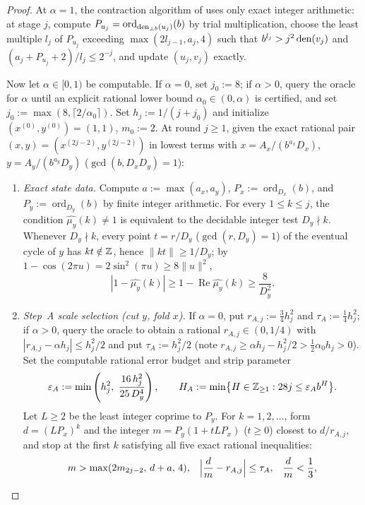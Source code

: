 \documentclass[11pt]{article}
\newcommand{\dist}[1]{\lVert #1\rVert}
\DeclareMathOperator{\ord}{ord}
\begin{document}
\begin{proof}
At $\alpha=1$, the contraction algorithm of  uses only exact integer arithmetic: at stage $j$, compute $P_{u_j}=\ord_{\den_{\perp b}(u_j)}(b)$ by trial multiplication, choose the least multiple $l_j$ of $P_{u_j}$ exceeding $\max(2l_{j-1},a_j,4)$ such that $b^{l_j}>j^2\operatorname{den}(v_j)$ and $(a_j+P_{u_j}+2)/l_j\le 2^{-j}$, and update $(u_j,v_j)$ exactly.

Now let $\alpha\in[0,1)$ be computable. If $\alpha=0$, set $j_0:=8$; if $\alpha>0$, query the oracle for $\alpha$ until an explicit rational lower bound $\alpha_0\in(0,\alpha)$ is certified, and set $j_0:=\max(8,\lceil 2/\alpha_0\rceil)$. Set $h_j:=1/(j+j_0)$ and initialize $(x^{(0)},y^{(0)})=(1,1)$, $m_0:=2$. At round $j\ge1$, given the exact rational pair $(x,y)=(x^{(2j-2)},y^{(2j-2)})$ in lowest terms with $x=A_x/(b^{a_x}D_x)$, $y=A_y/(b^{a_y}D_y)$ ($\gcd(b,D_xD_y)=1$):
\begin{enumerate}[label=\textup{Step \arabic*.},leftmargin=*,nosep]
\item \emph{Exact state data.} Compute $a:=\max(a_x,a_y)$, $P_x:=\ord_{D_x}(b)$, and $P_y:=\ord_{D_y}(b)$ by finite integer arithmetic. For every $1\le k\le j$, the condition $\widehat{\mu_y}(k)\ne1$ is equivalent to the decidable integer test $D_y\nmid k$. Whenever $D_y\nmid k$, every point $t=r/D_y$ ($\gcd(r,D_y)=1$) of the eventual cycle of $y$ has $kt\notin\mathbb Z$, hence $\dist{kt}\ge 1/D_y$; by $1-\cos(2\pi u)=2\sin^2(\pi u)\ge 8\dist{u}^2$,
\[
|1-\widehat{\mu_y}(k)|\ge 1-\operatorname{Re}\widehat{\mu_y}(k)\ge\frac{8}{D_y^2}.
\]
\item \emph{Step~A scale selection (cut $y$, fold $x$).} If $\alpha=0$, put $r_{A,j}:=\frac34 h_j^2$ and $\tau_A:=\frac14 h_j^2$; if $\alpha>0$, query the oracle to obtain a rational $r_{A,j}\in(0,1/4)$ with $|r_{A,j}-\alpha h_j|\le h_j^2/2$ and put $\tau_A:=h_j^2/2$ (note $r_{A,j}\ge\alpha h_j-h_j^2/2>\frac12\alpha_0h_j>0$). Set the computable rational error budget and strip parameter
\[
\varepsilon_A:=\min\left(h_j^2,\ \frac{16\,h_j^2}{25\,D_y^4}\right),\qquad
H_A:=\min\bigl\{H\in\Z_{\ge1}:28j\le\varepsilon_A b^H\bigr\}.
\]
Let $L\ge2$ be the least integer coprime to $P_y$. For $k=1,2,\dots$, form $d=(LP_x)^k$ and the integer $m=P_y(1+tLP_x)$ ($t\ge0$) closest to $d/r_{A,j}$, and stop at the first $k$ satisfying all five exact rational inequalities:
\begin{align*}
m&>\max(2m_{2j-2},\,d+a,\,4), &
\Bigl|\frac dm-r_{A,j}\Bigr|&\le\tau_A, &
\frac dm&<\frac13,\\

\end{align*}
\end{enumerate}
\end{proof}
\end{document}
